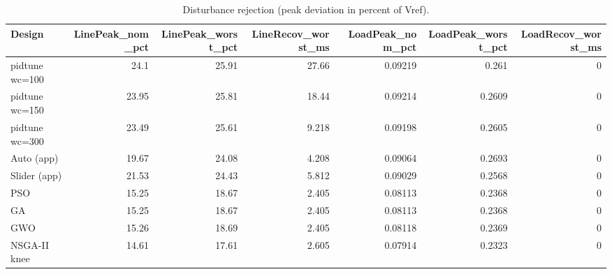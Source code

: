 \begin{table}[t]
\centering\caption{Disturbance rejection (peak deviation in percent of Vref).}\label{tab:dist}
\begin{tabular}{lrrrrrr}
\toprule
Design & LinePeak\_nom\_pct & LinePeak\_worst\_pct & LineRecov\_worst\_ms & LoadPeak\_nom\_pct & LoadPeak\_worst\_pct & LoadRecov\_worst\_ms \\
\midrule
pidtune wc=100 & 24.1 & 25.91 & 27.66 & 0.09219 & 0.261 & 0 \\
pidtune wc=150 & 23.95 & 25.81 & 18.44 & 0.09214 & 0.2609 & 0 \\
pidtune wc=300 & 23.49 & 25.61 & 9.218 & 0.09198 & 0.2605 & 0 \\
Auto (app) & 19.67 & 24.08 & 4.208 & 0.09064 & 0.2693 & 0 \\
Slider (app) & 21.53 & 24.43 & 5.812 & 0.09029 & 0.2568 & 0 \\
PSO & 15.25 & 18.67 & 2.405 & 0.08113 & 0.2368 & 0 \\
GA & 15.25 & 18.67 & 2.405 & 0.08113 & 0.2368 & 0 \\
GWO & 15.26 & 18.69 & 2.405 & 0.08118 & 0.2369 & 0 \\
NSGA-II knee & 14.61 & 17.61 & 2.605 & 0.07914 & 0.2323 & 0 \\
\bottomrule
\end{tabular}
\end{table}
